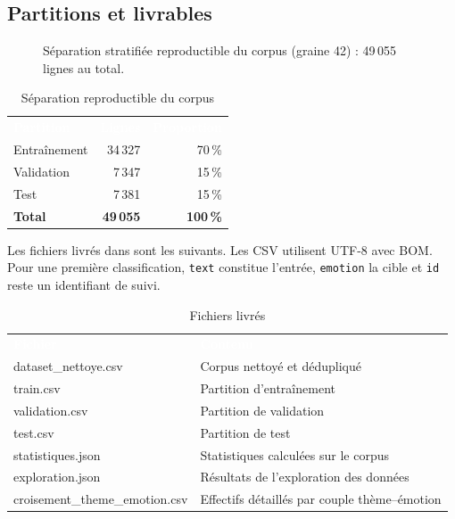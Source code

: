 \documentclass[11pt,a4paper]{article}
\DeclareRobustCommand{\file}[1]{{\small\urlstyle{tt}\path{#1}}}
\newcommand{\headtab}[1]{\textcolor{white}{\sffamily\bfseries #1}}
\begin{document}
\subsection{Partitions et livrables}
\begin{figure}[H]
\centering
{}
\caption{Séparation stratifiée reproductible du corpus (graine 42) : 49\,055 lignes au total.}
\end{figure}

\begin{table}[H]
\centering
\caption{Séparation reproductible du corpus}
\begin{tabular}{lrr}
\rowcolor{navy}\headtab{Partition} & \headtab{Lignes} & \headtab{Proportion} \\
Entraînement & 34\,327 & 70\,\% \\
Validation & 7\,347 & 15\,\% \\
Test & 7\,381 & 15\,\% \\
\midrule
\textbf{Total} & \textbf{49\,055} & \textbf{100\,\%} \\
\bottomrule
\end{tabular}
\end{table}

Les fichiers livrés dans \file{projet ML/donnees/} sont les suivants. Les CSV utilisent UTF-8 avec BOM. Pour une première classification, \texttt{text} constitue l'entrée, \texttt{emotion} la cible et \texttt{id} reste un identifiant de suivi.

\begin{table}[H]
\centering
\caption{Fichiers livrés}
\begin{tabularx}{\linewidth}{>{\ttfamily\small}l X}
\rowcolor{navy}\headtab{Fichier} & \headtab{Contenu} \\
dataset\_nettoye.csv & Corpus nettoyé et dédupliqué \\
train.csv & Partition d'entraînement \\
validation.csv & Partition de validation \\
test.csv & Partition de test \\
statistiques.json & Statistiques calculées sur le corpus \\
exploration.json & Résultats de l'exploration des données \\
croisement\_theme\_emotion.csv & Effectifs détaillés par couple thème--émotion \\
\bottomrule
\end{tabularx}
\end{table}
\end{document}
